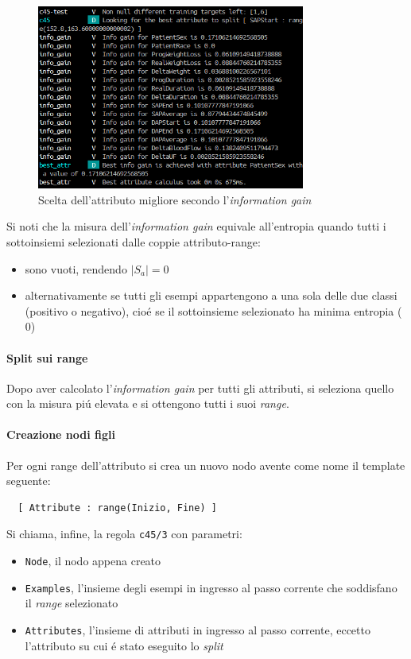 \documentclass[preprint]{acm_proc_article-sp}
\begin{document}
\begin{figure}[!htb]
\centering
\includegraphics[width=250pt]{figures/prolog-best-attribute.png}
\caption{Scelta dell'attributo migliore secondo l'\textit{information gain}}
\label{fig:prolog-best-attribute}
\end{figure}

Si noti che la misura dell'\textit{information gain} equivale all'entropia quando tutti i sottoinsiemi selezionati dalle coppie attributo-range:
\begin{itemize}
\item sono vuoti, rendendo $|S_a|=0$
\item alternativamente se tutti gli esempi appartengono a una sola delle due classi (positivo o negativo), cio\'e se il sottoinsieme selezionato ha minima entropia ($0$)
\end{itemize}

\paragraph{Split sui range}
Dopo aver calcolato l'\textit{information gain} per tutti gli attributi, si seleziona quello con la misura pi\'u elevata e si ottengono tutti i suoi \textit{range}.

\paragraph{Creazione nodi figli}
Per ogni range dell'attributo si crea un nuovo nodo avente come nome il template seguente:
\begin{verbatim}
  [ Attribute : range(Inizio, Fine) ]
\end{verbatim}
Si chiama, infine, la regola \verb|c45/3| con parametri:
\begin{itemize}
\item \verb|Node|, il nodo appena creato
\item \verb|Examples|, l'insieme degli esempi in ingresso al passo corrente che soddisfano il \textit{range} selezionato
\item \verb|Attributes|, l'insieme di attributi in ingresso al passo corrente, eccetto l'attributo su cui \'e stato eseguito lo \textit{split}
\end{itemize}
\end{document}
